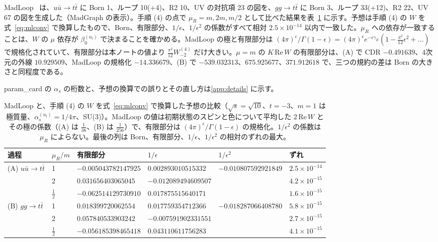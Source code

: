 \documentclass[a4paper,10pt]{ltjsarticle}
\begin{document}
MadLoop~\cite{hirschi11} は、$u\bar u\to t\bar t$ に Born 1、ループ 10(+4)、R2 10、UV の対抗項 23 の図を、$gg\to t\bar t$ に Born 3、ループ 33(+12)、R2 22、UV 67 の図を生成した（MadGraph の表示）。手順 (4) の点で $\mu_R=m,2m,m/2$ として比べた結果を表~\ref{tab:madloop} に示す。予想は手順 (4) の $W$ を式~\eqref{eq:mlconv} で換算したもので、Born、有限部分、$1/\epsilon$、$1/\epsilon^2$ の係数がすべて相対 $2.5\times10^{-14}$ 以内で一致した。$\mu_R$ への依存が一致することは、$W$ の $\mu$ 依存が $\beta_0^{(n_l)}$ で決まることを確かめる。MadLoop の極と有限部分は $(4\pi)^\epsilon/\Gamma(1-\epsilon)=(4\pi)^\epsilon e^{-\epsilon\gamma_E}(1-\frac{\pi^2}{12}\epsilon^2+\dots)$ で規格化されていて、有限部分は本ノートの値より $\frac{\pi^2}{12}W^{(4)}_{-2}$ だけ大きい。$\mu=m$ の $K\,\mathrm{Re}\,W$ の有限部分は、(A) で CDR $-0.491639$、4次元の外線 $10.929509$、MadLoop の規格化 $-14.336679$、(B) で $-539.032313$、$675.925677$、$371.912618$ で、三つの規約の差は Born の大きさと同程度である。

param\_card の $\alpha_s$ の桁数と、予想の換算での誤りとその直し方は\ref{app:details} に示す。

\begin{table}[tbp]
\centering\small
\caption{MadLoop と、手順 (4) の $W$ を式~\eqref{eq:mlconv} で換算した予想の比較（$\sqrt s=\sqrt{10}$、$t=-3$、$m=1$ は極質量、$\alpha_s^{(n_l)}=1/4\pi$、SU(3)）。MadLoop の値は初期状態のスピンと色について平均した $2\,\mathrm{Re}\,W$ とその極の係数（(A) は $\frac1{36}$、(B) は $\frac1{256}$）で、有限部分は $(4\pi)^\epsilon/\Gamma(1-\epsilon)$ の規格化。$1/\epsilon^2$ の係数は $\mu_R$ によらない。最後の列は Born、有限部分、$1/\epsilon$、$1/\epsilon^2$ の相対のずれの最大。}
\label{tab:madloop}
\begin{tabular}{llllll}
\toprule
過程 & $\mu_R/m$ & 有限部分 & $1/\epsilon$ & $1/\epsilon^2$ & ずれ \\
\midrule
(A) $u\bar u\to t\bar t$ & 1 & $-0.005043782147925$ & $0.002893010515332$ & $-0.010807592921849$ & $2.5\times10^{-14}$ \\
 & 2 & $0.031656403065045$ & $-0.012089494609507$ & & $4.2\times10^{-15}$ \\
 & $\frac12$ & $-0.062514129730910$ & $0.017875515640171$ & & $1.6\times10^{-15}$ \\
(B) $gg\to t\bar t$ & 1 & $0.018399720062554$ & $0.017759354712366$ & $-0.018287066408780$ & $5.8\times10^{-15}$ \\
 & 2 & $0.057840533903242$ & $-0.007591902331551$ & & $2.7\times10^{-15}$ \\
 & $\frac12$ & $-0.056185398465418$ & $0.043110611756283$ & & $4.1\times10^{-15}$ \\
\bottomrule
\end{tabular}
\end{table}
\end{document}
